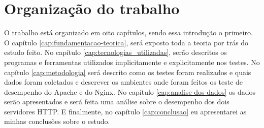 \section{Organização do trabalho}
O trabalho está organizado em oito capítulos, sendo essa introdução o primeiro. 
O capítulo \ref{cap:fundamentacao-teorica}, será exposto toda a teoria por trás 
do estudo feito. No capítulo \ref{cap:tecnologias_utilizadas}, serão descritos 
os programas e ferramentas utilizados implicitamente e explicitamente nos 
testes. No capítulo \ref{cap:metodologia} será descrito como os testes foram 
realizados e quais dados foram coletados e descrever os ambientes onde foram 
feitos os teste de desempenho do Apache e do Nginx. No capítulo 
\ref{cap:analise-dos-dados} os dados serão apresentados e 
será feita uma análise sobre o desempenho dos dois servidores HTTP. E 
finalmente, no capítulo \ref{cap:conclusao} eu apresentarei as minhas 
conclusões sobre o estudo.\\
